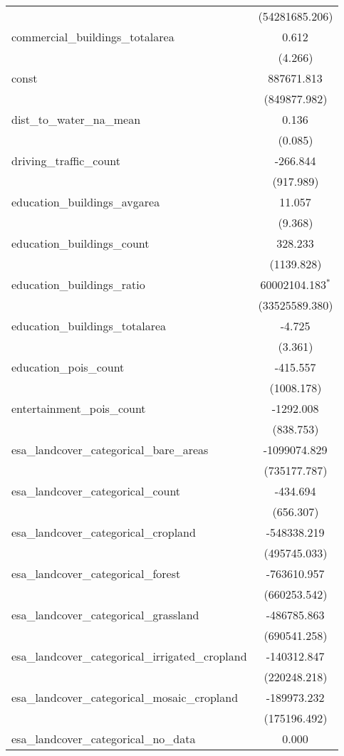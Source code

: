 \begin{table}[!htbp]
\begin{tabular}{@{\extracolsep{5pt}}lc}
  & (54281685.206) \\
 commercial_buildings_totalarea & 0.612$^{}$ \\
  & (4.266) \\
 const & 887671.813$^{}$ \\
  & (849877.982) \\
 dist_to_water_na_mean & 0.136$^{}$ \\
  & (0.085) \\
 driving_traffic_count & -266.844$^{}$ \\
  & (917.989) \\
 education_buildings_avgarea & 11.057$^{}$ \\
  & (9.368) \\
 education_buildings_count & 328.233$^{}$ \\
  & (1139.828) \\
 education_buildings_ratio & 60002104.183$^{*}$ \\
  & (33525589.380) \\
 education_buildings_totalarea & -4.725$^{}$ \\
  & (3.361) \\
 education_pois_count & -415.557$^{}$ \\
  & (1008.178) \\
 entertainment_pois_count & -1292.008$^{}$ \\
  & (838.753) \\
 esa_landcover_categorical_bare_areas & -1099074.829$^{}$ \\
  & (735177.787) \\
 esa_landcover_categorical_count & -434.694$^{}$ \\
  & (656.307) \\
 esa_landcover_categorical_cropland & -548338.219$^{}$ \\
  & (495745.033) \\
 esa_landcover_categorical_forest & -763610.957$^{}$ \\
  & (660253.542) \\
 esa_landcover_categorical_grassland & -486785.863$^{}$ \\
  & (690541.258) \\
 esa_landcover_categorical_irrigated_cropland & -140312.847$^{}$ \\
  & (220248.218) \\
 esa_landcover_categorical_mosaic_cropland & -189973.232$^{}$ \\
  & (175196.492) \\
 esa_landcover_categorical_no_data & 0.000$^{}$ \\

\end{tabular}
\end{table}
